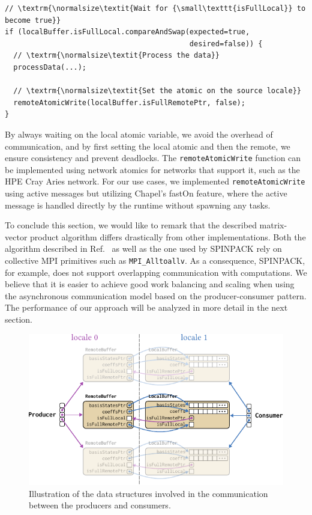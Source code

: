 \begin{verbatim}
// \textrm{\normalsize\textit{Wait for {\small\texttt{isFullLocal}} to become true}}
if (localBuffer.isFullLocal.compareAndSwap(expected=true,
                                           desired=false)) {
  // \textrm{\normalsize\textit{Process the data}}
  processData(...);

  // \textrm{\normalsize\textit{Set the atomic on the source locale}}
  remoteAtomicWrite(localBuffer.isFullRemotePtr, false);
}
\end{verbatim}

By always waiting on the local atomic variable, we avoid the overhead of communication, and by first setting the local atomic and then the remote, we ensure consistency and prevent deadlocks. The \verb|remoteAtomicWrite| function can be implemented using network atomics for networks that support it, such as the HPE Cray Aries network. For our use cases, we implemented \verb|remoteAtomicWrite| using active messages but utilizing Chapel's fastOn feature, where the active message is handled directly by the runtime without spawning any tasks.

To conclude this section, we would like to remark that the described matrix-vector product algorithm differs drastically from other implementations. Both the algorithm described in Ref.~\cite{Wietek2018subla} as well as the one used by SPINPACK rely on collective MPI primitives such as \verb|MPI_Alltoallv|. As a consequence, SPINPACK, for example, does not support overlapping communication with computations. We believe that it is easier to achieve good work balancing and scaling when using the asynchronous communication model based on the producer-consumer pattern. The performance of our approach will be analyzed in more detail in the next section.

\begin{figure}
    \centering
    \includegraphics[width=0.7\linewidth]{./chapters/Proceedings_PAW_ATM_2023/algo-producerConsumer.pdf}
    \caption{Illustration of the data structures involved in the communication between the producers and consumers.}
    \label{fig:ls23:algo:producer-consumer}
\end{figure}

